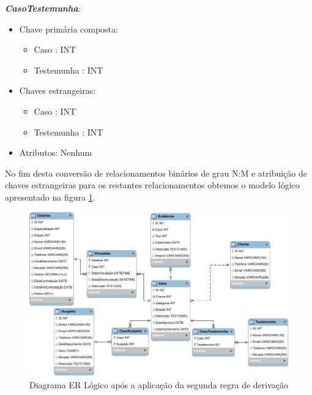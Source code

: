 \documentclass[a4paper,12pt]{scrreprt}
\begin{document}
        \clearpage           
        
        \textbf{\textit{CasoTestemunha}}:
        \begin{itemize}
            \item Chave primária composta:
                \begin{itemize}
                    \item Caso : INT
                    \item Testemunha : INT
                \end{itemize}
            \item Chaves estrangeiras:
                \begin{itemize}
                    \item Caso : INT
                    \item Testemunha : INT
                \end{itemize}
            \item Atributos: Nenhum
        \end{itemize}

        \vspace{0.2cm}

        No fim desta conversão de relacionamentos binários de grau N:M e atribuição de chaves estrangeiras para os restantes relacionamentos obtemos o modelo lógico apresentado na figura \ref{fig:4.2}.


        \begin{figure}
            \centering
            \includegraphics[scale=1,angle=0]{images/modelo_logico/regra2.pdf}
            \caption{Diagrama ER Lógico após a aplicação da segunda regra de derivação}
            \label{fig:4.2}
        \end{figure}
\end{document}
